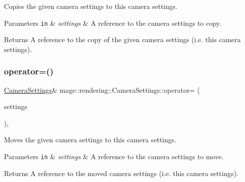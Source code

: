 Copies the given camera settings to this camera settings.


\begin{DoxyParams}[1]{Parameters}
\mbox{\tt in}  & {\em settings} & A reference to the camera settings to copy. \\
\hline
\end{DoxyParams}
\begin{DoxyReturn}{Returns}
A reference to the copy of the given camera settings (i.\+e. this camera settings). 
\end{DoxyReturn}
\mbox{\label{classmage_1_1rendering_1_1_camera_settings_a28ae670d467adfc74ef8929f24b2e615}} 
\subsubsection{\texorpdfstring{operator=()}{operator=()}\hspace{0.1cm}{\footnotesize\ttfamily [2/2]}}
{\footnotesize\ttfamily \mbox{\hyperlink{classmage_1_1rendering_1_1_camera_settings}{Camera\+Settings}}\& mage\+::rendering\+::\+Camera\+Settings\+::operator= (\begin{DoxyParamCaption}\item[{\mbox{\hyperlink{classmage_1_1rendering_1_1_camera_settings}{Camera\+Settings}} \&\&}]{settings }\end{DoxyParamCaption})\hspace{0.3cm}{\ttfamily [default]}, {\ttfamily [noexcept]}}

Moves the given camera settings to this camera settings.


\begin{DoxyParams}[1]{Parameters}
\mbox{\tt in}  & {\em settings} & A reference to the camera settings to move. \\
\hline
\end{DoxyParams}
\begin{DoxyReturn}{Returns}
A reference to the moved camera settings (i.\+e. this camera settings). 
\end{DoxyReturn}
\mbox{\label{classmage_1_1rendering_1_1_camera_settings_a49c766f4880c798a90a9b8fe488a6711}} 
